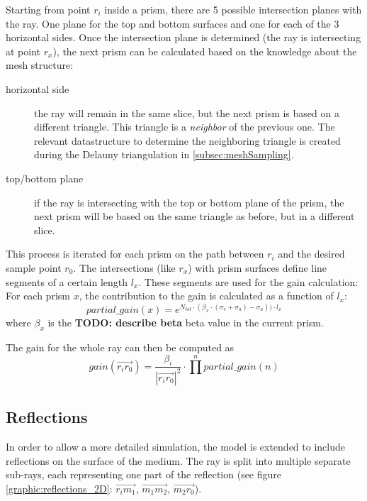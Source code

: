 Starting from point $r_i$ inside a prism, there are 5 possible intersection
planes with the ray. One plane for the top and bottom surfaces and one for each
of the 3 horizontal sides. Once the intersection plane is determined (the ray is
intersecting at point $r_x$), the next prism can be calculated based on the
knowledge about the mesh structure:

\begin{description}

  \item[horizontal side]
    the ray will remain in the same slice, but the next prism is based on a
    different triangle. This triangle is a \emph{neighbor} of the previous one.
    The relevant datastructure to determine the neighboring triangle is created
    during the Delauny triangulation in \ref{subsec:meshSampling}.

  \item[top/bottom plane]
    if the ray is intersecting with the top or bottom plane of the prism, the
    next prism will be based on the same triangle as before, but in a different
    slice.

\end{description}

This process is iterated for each prism on the path between $r_i$ and the
desired sample point $r_0$. The intersections (like $r_x$) with prism surfaces
define line segments of a certain length $l_x$. These segments are used for the
gain calculation: For each prism $x$, the contribution to the gain is calculated
as a function of $l_x$:
\[ 
  partial\_gain(x) = 
  e^{N_{tot} \cdot (\beta_x \cdot (\sigma_e + \sigma_a) - \sigma_a)) \cdot l_x}
\]
where $\beta_x$ is the \textbf{TODO: describe beta} beta value in the current
prism.

The gain for the whole ray can then be computed as
\[ 
  gain(\overrightarrow{r_ir_0}) =  
  \frac{\beta_i}{ |\overrightarrow{r_ir_0}|^2} \cdot \prod^npartial\_gain(n) 
\]



\subsection{Reflections}
\label{subsec:reflections}

In order to allow a more detailed simulation, the model is extended to include
reflections on the surface of the medium. The ray is split into multiple
separate sub-rays, each representing one part of the reflection (see figure
\ref{graphic:reflections_2D}: $\overrightarrow{r_im_1}$,
$\overrightarrow{m_1m_2}$, $\overrightarrow{m_2r_0}$).


